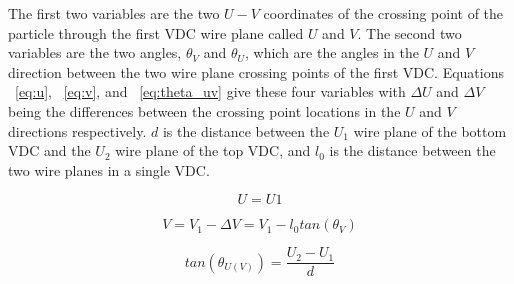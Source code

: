 The first two variables are the two $U-V$ coordinates of the crossing point of the particle through the first VDC wire plane called $U$ and $V$. The second two variables are the two angles, $\theta_V$ and $\theta_U$, which are the angles in the $U$ and $V$ direction between the two wire plane crossing points of the first VDC. Equations ~\ref{eq:u}, ~\ref{eq:v}, and ~\ref{eq:theta_uv} give these four variables with $\Delta U$ and $\Delta V$ being the differences between the crossing point locations in the $U$ and $V$ directions respectively. $d$ is the distance between the $U_1$ wire plane of the bottom VDC and the $U_2$ wire plane of the top VDC, and $l_0$ is the distance between the two wire planes in a single VDC.

\begin{equation} \label{eq:u}
	U = U1
\end{equation}

\begin{equation} \label{eq:v}
	V = V_1-\Delta V = V_1 - l_0 tan\left( \theta_V \right)
\end{equation}

\begin{equation} \label{eq:theta_uv}
	tan\left( \theta_{U(V)} \right) = \frac{U_2-U_1}{d}
\end{equation}